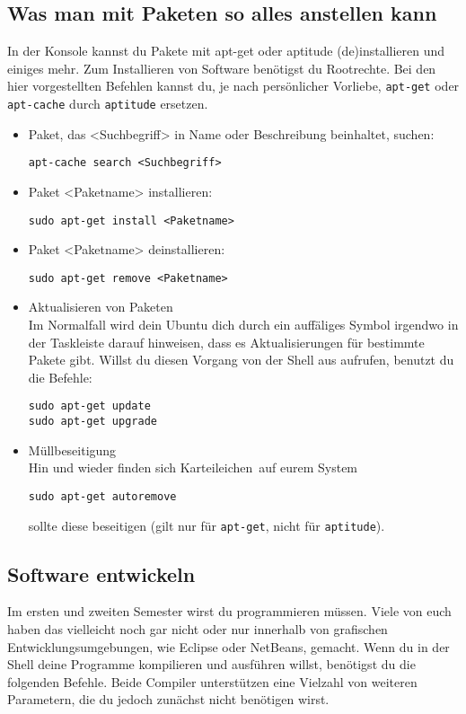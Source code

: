 \documentclass[a4paper,12pt]{article}
\begin{document}
\subsection{Was man mit Paketen so alles anstellen kann}
 In der Konsole kannst du Pakete mit apt-get oder aptitude (de)installieren 
und einiges mehr. Zum Installieren von Software benötigst du Rootrechte. 
Bei den hier vorgestellten Befehlen kannst du, je nach persönlicher Vorliebe,  
\texttt{apt-get} oder \texttt{apt-cache} durch \texttt{aptitude} ersetzen.
\begin{itemize}
\item Paket, das <Suchbegriff> in Name oder Beschreibung beinhaltet, suchen: 
\begin{lstlisting}
apt-cache search <Suchbegriff>
\end{lstlisting} 
\item Paket <Paketname> installieren:
\begin{lstlisting}
sudo apt-get install <Paketname>
\end{lstlisting} 
\item Paket <Paketname> deinstallieren:
\begin{lstlisting}
sudo apt-get remove <Paketname>
\end{lstlisting} 
\item Aktualisieren von Paketen \\
Im Normalfall wird dein Ubuntu dich durch ein auffäliges Symbol irgendwo 
in der Taskleiste darauf hinweisen, dass es Aktualisierungen für bestimmte 
Pakete gibt. Willst du diesen Vorgang von der Shell aus aufrufen, benutzt 
du die Befehle:
\begin{lstlisting}
sudo apt-get update
sudo apt-get upgrade
\end{lstlisting} 
\item Müllbeseitigung \\
Hin und wieder finden sich \glqq Karteileichen\grqq ~auf eurem System
\begin{lstlisting}
sudo apt-get autoremove
\end{lstlisting} 
sollte diese beseitigen (gilt nur für \texttt{apt-get}, nicht für \texttt{aptitude}).
\end{itemize}

\subsection{Software entwickeln}
Im ersten und zweiten Semester wirst du programmieren müssen. Viele von 
euch haben das vielleicht noch gar nicht oder nur innerhalb von grafischen
Entwicklungsumgebungen, wie Eclipse oder NetBeans, gemacht. Wenn du in 
der Shell deine Programme kompilieren und ausführen willst, benötigst du 
die folgenden Befehle. Beide Compiler unterstützen eine Vielzahl von
weiteren Parametern, die du jedoch zunächst nicht benötigen wirst.
\end{document}
